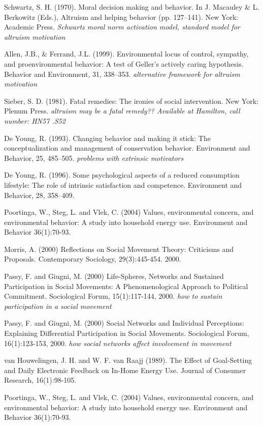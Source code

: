 Schwartz, S. H. (1970). Moral decision making and behavior. In J. Macauley \& L. Berkowitz (Eds.), Altruism and helping behavior (pp. 127–141). New York: Academic Press. \emph{Schwartz moral norm activation model, standard model for altruism motivation}

Allen, J.B., \& Ferrand, J.L. (1999). Environmental locus of control, sympathy, and proenvironmental behavior: A test of Geller’s actively caring hypothesis. Behavior and Environment, 31, 338–353. \emph{alternative framework for altruism motivation}

Sieber, S. D. (1981). Fatal remedies: The ironies of social intervention. New York: Plenum Press. \emph{altruism may be a fatal remedy?? Available at Hamilton, call number: HN57 .S52}

De Young, R. (1993). Changing behavior and making it stick: The conceptualization and management of conservation behavior. Environment and Behavior, 25, 485–505. \emph{problems with extrinsic motivators}

De Young, R. (1996). Some psychological aspects of a reduced consumption lifestyle: The role of intrinsic satisfaction and competence. Environment and Behavior, 28, 358–409.

Poortinga, W., Steg, L. and Vlek, C. (2004) Values, environmental concern, and environmental behavior: A study into household energy use. Environment and Behavior 36(1):70-93.  

Morris, A. (2000) Reflections on Social Movement Theory: Criticisms and Proposals. Contemporary Sociology, 29(3):445-454. 2000.

Passy, F. and Giugni, M. (2000) Life-Spheres, Networks and Sustained Participation in Social Movements: A Phenomenological Approach to Political Commitment. Sociological Forum, 15(1):117-144, 2000. \emph{how to sustain participation in a social movement}

Passy, F. and Giugni, M. (2000) Social Networks and Individual Perceptions: Explaining Differential Participation in Social Movements. Sociological Forum, 16(1):123-153, 2000. \emph{how social networks affect involvement in movement}

van Houwelingen, J. H. and W. F. van Raajj (1989). The Effect of Goal-Setting and Daily Electronic Feedback on In-Home Energy Use. Journal of Consumer Research, 16(1):98-105.

Poortinga, W., Steg, L. and Vlek, C. (2004) Values, environmental concern, and environmental behavior: A study into household energy use. Environment and Behavior 36(1):70-93.

